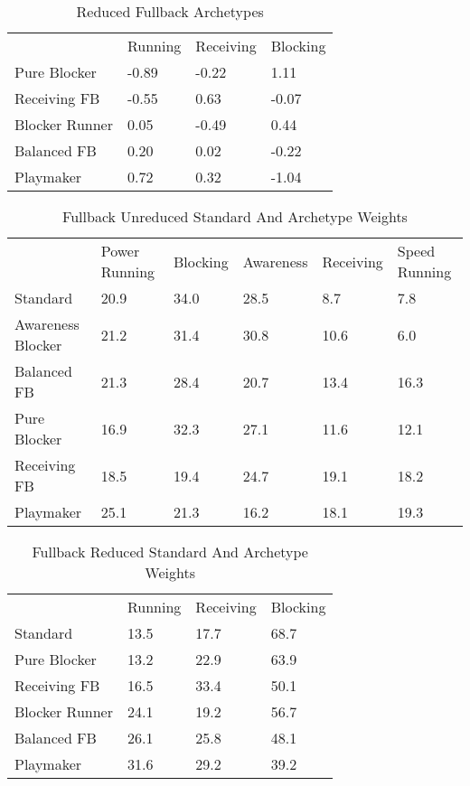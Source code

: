 \documentclass[11pt]{article}
\begin{document}
\begin{table}[]
\centering
\caption{Reduced Fullback Archetypes}
\label{ReducedFullback}
\begin{tabular}{llll}
               & Running & Receiving & Blocking \\
Pure Blocker   & -0.89   & -0.22     & 1.11     \\
Receiving FB   & -0.55   & 0.63      & -0.07    \\
Blocker Runner & 0.05    & -0.49     & 0.44     \\
Balanced FB    & 0.20    & 0.02      & -0.22    \\
Playmaker      & 0.72    & 0.32      & -1.04   
\end{tabular}
\end{table}

\begin{table}[]
\centering
\caption{Fullback Unreduced Standard And Archetype Weights}
\label{FullbackUnreducedWeights}
\begin{tabular}{llllll}
                  & Power Running & Blocking & Awareness & Receiving & Speed Running \\
Standard          & 20.9          & 34.0     & 28.5      & 8.7       & 7.8           \\
Awareness Blocker & 21.2          & 31.4     & 30.8      & 10.6      & 6.0           \\
Balanced FB       & 21.3          & 28.4     & 20.7      & 13.4      & 16.3          \\
Pure Blocker      & 16.9          & 32.3     & 27.1      & 11.6      & 12.1          \\
Receiving FB      & 18.5          & 19.4     & 24.7      & 19.1      & 18.2          \\
Playmaker         & 25.1          & 21.3     & 16.2      & 18.1      & 19.3         
\end{tabular}
\end{table}

\begin{table}[]
\centering
\caption{Fullback Reduced Standard And Archetype Weights}
\label{FullbackReducedWeights}
\begin{tabular}{llll}
               & Running & Receiving & Blocking \\
Standard       & 13.5    & 17.7      & 68.7     \\
Pure Blocker   & 13.2    & 22.9      & 63.9     \\
Receiving FB   & 16.5    & 33.4      & 50.1     \\
Blocker Runner & 24.1    & 19.2      & 56.7     \\
Balanced FB    & 26.1    & 25.8      & 48.1     \\
Playmaker      & 31.6    & 29.2      & 39.2    
\end{tabular}
\end{table}
\end{document}
